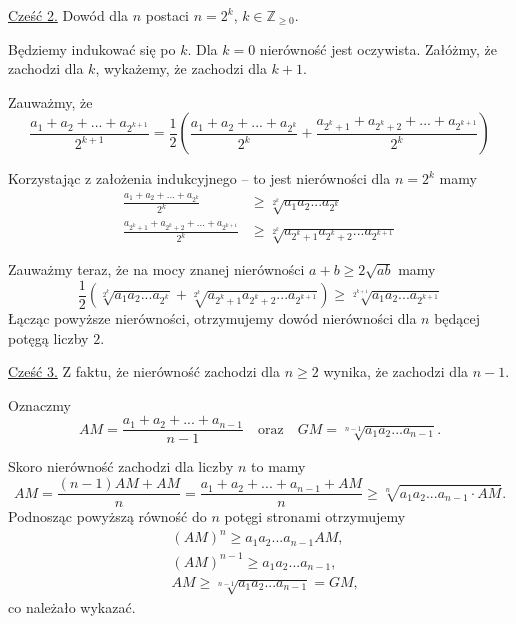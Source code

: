 \noindent
\underline{Cześć 2.} Dowód dla $n$ postaci $n = 2^k$, $k \in \mathbb{Z}_{\geqslant 0}$.

\vspace{10px}

\noindent
Będziemy indukować się po $k$. Dla $k = 0$ nierówność jest oczywista. Załóżmy, że zachodzi dla $k$, wykażemy, że zachodzi dla $k + 1$.

\noindent
Zauważmy, że
\[
    \frac{a_1 + a_2 + ... + a_{2^{k + 1}}}{2^{k + 1}} = \frac{1}{2}\left( \frac{a_1 + a_2 + ... + a_{2^{k}}}{2^{k}} + \frac{a_{2^k + 1} + a_{2^k + 2} + ... + a_{2^{k + 1}}}{2^{k}}\right)
\]

\noindent
Korzystając z założenia indukcyjnego -- to jest nierówności dla $n = 2^{k}$ mamy
\begin{align*}
    \frac{a_1 + a_2 + ... + a_{2^{k}}}{2^{k}} &\geqslant \sqrt[2^k]{a_1a_2...a_{2^k}} \\
   \frac{a_{2^k + 1} + a_{2^k + 2} + ... + a_{2^{k + 1}}}{2^{k}} &\geqslant \sqrt[2^k]{a_{2^k + 1}a_{2^k + 2}...a_{2^{k + 1}}}
\end{align*}

\noindent
Zauważmy teraz, że na mocy znanej nierówności $a + b \geqslant 2\sqrt{ab}$ mamy
\[
    \frac{1}{2}\left(\sqrt[2^k]{a_1a_2...a_{2^k}} + \sqrt[2^k]{a_{2^k + 1}a_{2^k + 2}...a_{2^{k + 1}}}\right) \geqslant \sqrt[2^{k + 1}]{a_1a_2...a_{2^{k + 1}}}
\]
Łącząc powyższe nierówności, otrzymujemy dowód nierówności dla $n$ będącej potęgą liczby $2$.

\vspace{10px}

\noindent
\underline{Cześć 3.} Z faktu, że nierówność zachodzi dla $n \geqslant 2$ wynika, że zachodzi dla $n - 1$.

\vspace{10px}

\noindent
Oznaczmy 
\[
    AM = \frac{a_1 + a_2 + ... + a_{n - 1}}{n - 1} \quad \text{oraz} \quad GM = \sqrt[n - 1]{a_1a_2...a_{n - 1}}.
\]

\noindent
Skoro nierówność zachodzi dla liczby $n$ to mamy
\[
    AM = \frac{(n-1)AM + AM}{n} = \frac{a_1 + a_2 + ... + a_{n - 1} + AM}{n} \geqslant \sqrt[n]{a_1a_2...a_{n - 1}\cdot AM}.
\]
Podnosząc powyższą równość do $n$ potęgi stronami otrzymujemy
\begin{align*}
    &(AM)^n \geqslant a_1a_2...a_{n-1}AM, \\
    &(AM)^{n - 1} \geqslant a_1a_2...a_{n-1}, \\
    &AM \geqslant \sqrt[n - 1]{a_1a_2...a_{n-1}} = GM,
\end{align*}
co należało wykazać.

